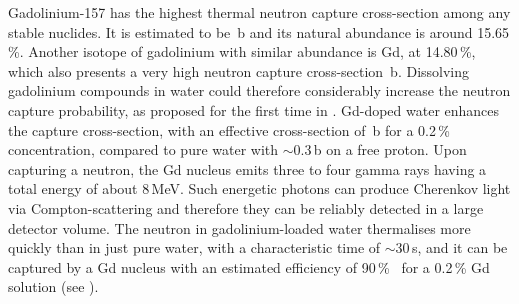 Gadolinium-157 has the highest thermal neutron capture cross-section among any stable nuclides.
It is estimated to be \,b and its natural abundance is around 15.65\,\%.
Another isotope of gadolinium with similar abundance is Gd, at 14.80\,\%, %
which also presents a very high neutron capture cross-section \,b.
Dissolving gadolinium compounds in water could therefore considerably increase the neutron capture %
probability, as proposed for the first time in .
Gd-doped water enhances the capture cross-section, with an effective cross-section of \,b for a 0.2\,\% concentration, %
compared to pure water with $\sim$0.3\,b on a free proton.
Upon capturing a neutron, the Gd nucleus emits three to four gamma rays having a total energy of about 8\,MeV.
Such energetic photons can produce Cherenkov light via Compton-scattering and therefore they can be 
reliably detected in a large detector volume.
The neutron in gadolinium-loaded water thermalises more quickly than in just pure water, with a %
characteristic time of $\sim$30\,\textmu s, and it can be captured by a Gd nucleus with an %
estimated efficiency of 90\,\%~\cite{Beacom:2003nk} for a 0.2\,\% Gd solution (see ).

